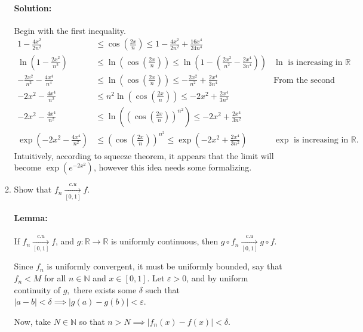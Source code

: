 \documentclass{article}
\begin{document}
\begin{enumerate}
\begin{enumerate}
        \paragraph{Solution: }Begin with the first inequality. 
        \begin{align*}
            1-\frac{4x^2}{2n^2}&\leq \cos \left(   \frac{2x}{n}\right)\leq 1-\frac{4x^2}{2n^2}+\frac{16x^4}{24n^{4}}\\
            \ln\left(  1-\frac{2x^2}{n^2}\right) &\leq\ln \left(  \cos \left(   \frac{2x}{n}\right)\right) \leq\ln\left( 1-\left( \frac{2x^2}{n^2}-\frac{2 x^4}{3n^{4}}\right)  \right) &\ln\text{ is increasing in }\mathbb{R}\\
            -\frac{2x^2}{n^2}-\frac{4x^4}{n^4}&\leq \ln \left(  \cos \left(   \frac{2x}{n}\right)\right)\leq-\frac{2x^2}{n^2}+\frac{2x^4}{3n^{4}}&\text{From the second inequality}\\
            -{2x^2}-\frac{4x^4}{n^2}&\leq n^2 \ln \left(  \cos \left(   \frac{2x}{n}\right)\right)\leq{-2x^2}+\frac{2x^4}{3n^{2}}\\
            -{2x^2}-\frac{4x^4}{n^2}&\leq \ln \left( \left( \cos \left(   \frac{2x}{n}\right)\right)^{n^2}\right)\leq{-2x^2}+\frac{2x^4}{3n^{2}}\\
            \exp\left( -{2x^2}-\frac{4x^4}{n^2} \right) &\leq \left( \cos \left(   \frac{2x}{n}\right)\right)^{n^2}\leq\exp\left( -{2x^2}+\frac{2x^4}{3n^{2}} \right) &\exp\text{ is increasing in }\mathbb{R}
        .\end{align*}
        Intuitively, according to squeeze theorem, it appears that the limit will become $\exp\left( e^{-2x^2} \right) $, however this idea needs some formalizing.
    \item Show that $f_n\xrightarrow[{[0,1]}]{c.u}f$.
        \paragraph{Lemma:} If $ f_n\xrightarrow[{[0,1]}]{c.u}f$, and $g:\mathbb{R}\to \mathbb{R}$ is uniformly continuous, then $ g\circ f_n\xrightarrow[{[0,1]}]{c.u}g\circ f$.

        Since $f_n$ is uniformly convergent, it must be uniformly bounded, say that $f_n<M$ for all $n\in \mathbb{N}$ and $x\in [0,1]$. Let $\varepsilon>0$, and by uniform continuity of $g,$ there exists some $\delta$ such that $|a-b|<\delta\implies|g(a)-g(b)|<\varepsilon$.

        Now, take $N\in \mathbb{N}$ so that $n>N\implies|f_n(x)-f(x)|<\delta$.


\end{enumerate}
\end{enumerate}
\end{document}
